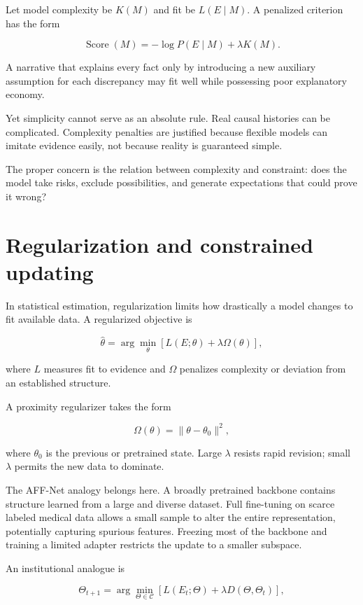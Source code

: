 Let model complexity be \(K(M)\) and fit be \(L(E\mid M)\). A penalized criterion has the form

\[
\operatorname{Score}(M)
=
-\log P(E\mid M)+\lambda K(M).
\]

A narrative that explains every fact only by introducing a new auxiliary assumption for each discrepancy may fit well while possessing poor explanatory economy.

Yet simplicity cannot serve as an absolute rule. Real causal histories can be complicated. Complexity penalties are justified because flexible models can imitate evidence easily, not because reality is guaranteed simple.

The proper concern is the relation between complexity and constraint: does the model take risks, exclude possibilities, and generate expectations that could prove it wrong?

\section{Regularization and constrained updating}
\label{sec:a45}

In statistical estimation, regularization limits how drastically a model changes to fit available data. A regularized objective is

\[
\widehat\theta
=
\arg\min_\theta
\left[
L(E;\theta)+\lambda\Omega(\theta)
\right],
\]

where \(L\) measures fit to evidence and \(\Omega\) penalizes complexity or deviation from an established structure.

A proximity regularizer takes the form

\[
\Omega(\theta)
=
\|\theta-\theta_0\|^2,
\]

where \(\theta_0\) is the previous or pretrained state. Large \(\lambda\) resists rapid revision; small \(\lambda\) permits the new data to dominate.

The AFF-Net analogy belongs here. A broadly pretrained backbone contains structure learned from a large and diverse dataset. Full fine-tuning on scarce labeled medical data allows a small sample to alter the entire representation, potentially capturing spurious features. Freezing most of the backbone and training a limited adapter restricts the update to a smaller subspace.

An institutional analogue is

\[
\Theta_{t+1}
=
\arg\min_{\Theta\in\mathcal C}
\left[
L(E_t;\Theta)
+
\lambda D(\Theta,\Theta_t)
\right],
\]

